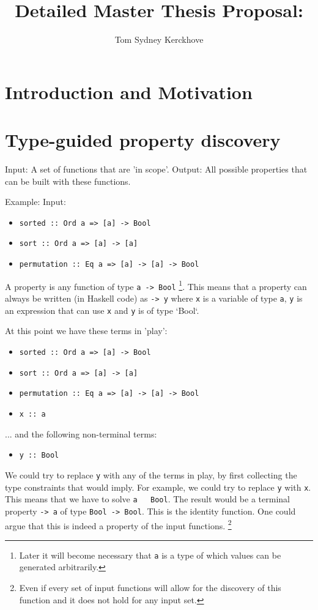 \documentclass[a4paper, 11pt]{article}
\title{Detailed Master Thesis Proposal:\\\vspace{0.5cm}{\Huge Functional Property Discovery and Corresponding Test Generation in Haskell}}
\author{Tom Sydney Kerckhove}
\newcommand{\h}[1]{\texttt{#1}}
\begin{document}
\maketitle

\section{Introduction and Motivation}

\newpage

\section{Type-guided property discovery}

Input: A set of functions that are 'in scope'.
Output: All possible properties that can be built with these functions.

Example:
Input: 
\begin{itemize}
  \item \h{sorted :: Ord a => [a] -> Bool}
  \item \h{sort :: Ord a => [a] -> [a]}
  \item \h{permutation :: Eq a => [a] -> [a] -> Bool}
\end{itemize}

A property is any function of type \h{a -> Bool} \footnote{Later it will become necessary that \h{a} is a type of which values can be generated arbitrarily.}.
This means that a property can always be written (in Haskell code) as \h{\x -> y} where \h{x} is a variable of type \h{a}, \h{y} is an expression that can use \h{x} and \h{y} is of type `Bool`.

At this point we have these terms in 'play':

\begin{itemize}
  \item \h{sorted :: Ord a => [a] -> Bool}
  \item \h{sort :: Ord a => [a] -> [a]}
  \item \h{permutation :: Eq a => [a] -> [a] -> Bool}
  \item \h{x :: a}
\end{itemize}

... and the following non-terminal terms:

\begin{itemize}
  \item \h{y :: Bool}
\end{itemize}

We could try to replace \h{y} with any of the terms in play, by first collecting the type constraints that would imply.
For example, we could try to replace \h{y} with \h{x}.
This means that we have to solve \h{a ~ Bool}.
The result would be a terminal property \h{\a -> a} of type \h{Bool -> Bool}.
This is the identity function.
One could argue that this is indeed a property of the input functions.
\footnote{Even if every set of input functions will allow for the discovery of this function and it does not hold for any input set.}
\end{document}
